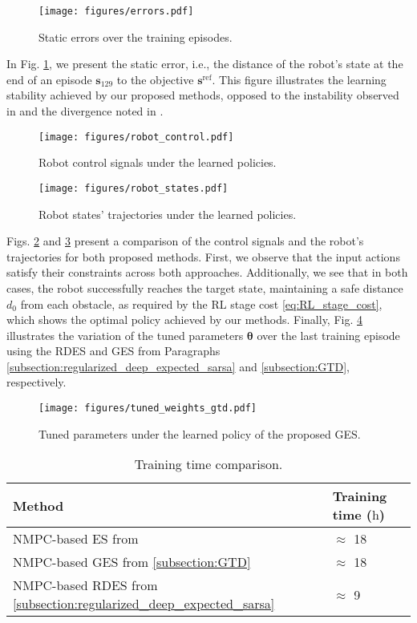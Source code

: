 \documentclass[letterpaper, 10pt, conference]{ieeeconf}
\begin{document}
\begin{figure}[!t]
	\centering
	\texttt{[image: figures/errors.pdf]}
	\caption{Static errors over the training episodes.}
	\label{fig:tracking_errors_comp}
\end{figure}

In Fig. \ref{fig:tracking_errors_comp}, we present the static error, i.e., the distance of the robot's state at the end of an episode $\mathbf{s}_{129}$ to the objective $\mathbf{s}^{\text{ref}}$.
This figure illustrates the learning stability achieved by our proposed methods, opposed to the instability observed in \cite{moradimaryamnegari2022model} and the divergence noted in \cite{moradimaryamnegari2023data}.

\begin{figure}[!tb]
	\centering
	\texttt{[image: figures/robot\_control.pdf]}
	\caption{Robot control signals under the learned policies.}
	\label{fig:rob_control_signals}
\end{figure}
\begin{figure}[!tb]
	\centering
	\texttt{[image: figures/robot\_states.pdf]}
	\caption{Robot states' trajectories under the learned policies.}
	\label{fig:robot_traj}
\end{figure}

Figs. \ref{fig:rob_control_signals} and \ref{fig:robot_traj} present a comparison of the control signals and the robot's trajectories for both proposed methods.
First, we observe that the input actions satisfy their constraints across both approaches.
Additionally, we see that in both cases, the robot successfully reaches the target state, maintaining a safe distance $d_0$ from each obstacle, as required by the RL stage cost \eqref{eq:RL_stage_cost}, which shows the optimal policy achieved by our methods.
Finally, Fig. \ref{fig:tuned_params} illustrates the variation of the tuned parameters $\boldsymbol{\theta}$ over the last training episode using the RDES and GES from Paragraphs \ref{subsection:regularized_deep_expected_sarsa} and \ref{subsection:GTD}, respectively.

\begin{figure}[!bt]
	\centering
	\texttt{[image: figures/tuned\_weights\_gtd.pdf]}
	\caption{Tuned parameters under the learned policy of the proposed GES.}
	\label{fig:tuned_params}
\end{figure}

\begin{table}[!tb]
	\caption{Training time comparison.}
	\label{table: Training time comparison}
	\centering
	\begin{tabular}{ll}
		\hline
			Method & Training time ($\si{\hour}$)\\
		\hline
			NMPC-based ES from \cite{moradimaryamnegari2022model} & $\approx$ 18\\
			NMPC-based GES from \ref{subsection:GTD} & $\approx$ 18\\
			NMPC-based RDES from \ref{subsection:regularized_deep_expected_sarsa} & $\approx$ 9\\
		\hline
	\end{tabular}
\end{table}
\end{document}
